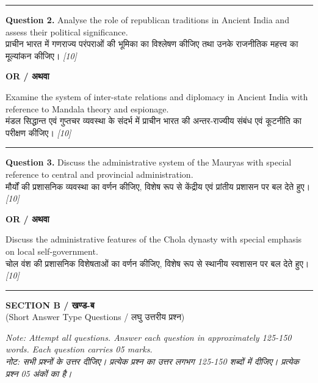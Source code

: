 \documentclass[11pt,a4paper]{article}
\newcommand{\pts}[1]{\hfill \textit{[#1]}}
\begin{document}
\medskip\rule{\linewidth}{0.2pt}\medskip

\noindent \textbf{Question 2.} Analyse the role of republican traditions in Ancient India and assess their political significance.\\[1pt]
प्राचीन भारत में गणराज्य परंपराओं की भूमिका का विश्लेषण कीजिए तथा उनके राजनीतिक महत्त्व का मूल्यांकन कीजिए। \pts{10}

\begin{center}
  \textbf{OR / अथवा}
\end{center}

\noindent Examine the system of inter-state relations and diplomacy in Ancient India with reference to Mandala theory and espionage.\\[1pt]
मंडल सिद्धान्त एवं गुप्तचर व्यवस्था के संदर्भ में प्राचीन भारत की अन्तर-राज्यीय संबंध एवं कूटनीति का परीक्षण कीजिए। \pts{10}

\medskip\rule{\linewidth}{0.2pt}\medskip

\noindent \textbf{Question 3.} Discuss the administrative system of the Mauryas with special reference to central and provincial administration.\\[1pt]
मौर्यों की प्रशासनिक व्यवस्था का वर्णन कीजिए, विशेष रूप से केंद्रीय एवं प्रांतीय प्रशासन पर बल देते हुए। \pts{10}

\begin{center}
  \textbf{OR / अथवा}
\end{center}

\noindent Discuss the administrative features of the Chola dynasty with special emphasis on local self-government.\\[1pt]
चोल वंश की प्रशासनिक विशेषताओं का वर्णन कीजिए, विशेष रूप से स्थानीय स्वशासन पर बल देते हुए। \pts{10}

\bigskip
\rule{\linewidth}{0.2pt}
\bigskip

\begin{center}
  {\large\bfseries SECTION B / खण्ड-ब}\\[2pt]
  {\normalsize (Short Answer Type Questions / लघु उत्तरीय प्रश्न)}
\end{center}

\noindent \textit{Note: Attempt all questions. Answer each question in approximately 125-150 words. Each question carries 05 marks.}\\[2pt]
\noindent \textit{नोट: सभी प्रश्नों के उत्तर दीजिए। प्रत्येक प्रश्न का उत्तर लगभग 125-150 शब्दों में दीजिए। प्रत्येक प्रश्न 05 अंकों का है।}

\bigskip
\end{document}
